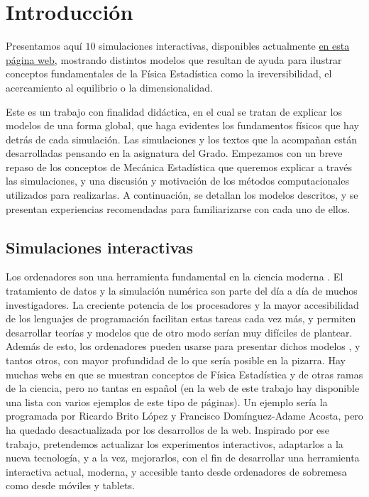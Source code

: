 \documentclass[11pt, a4paper]{article} %
\theoremstyle{named}
\begin{document}

\newpage
{}

\tableofcontents

\newpage
\section{Introducción}
\label{sec:intro}

Presentamos aquí $10$ simulaciones interactivas, disponibles actualmente \href{http://funcionando.works/TFG/index.html}{en esta página web}, mostrando distintos modelos que resultan de ayuda para ilustrar conceptos fundamentales de la Física Estadística como la ireversibilidad, el acercamiento al equilibrio o la dimensionalidad.

Este es un trabajo con finalidad didáctica, en el cual se tratan de explicar los modelos de una forma global, que haga evidentes los fundamentos físicos que hay detrás de cada simulación. Las simulaciones y los textos que la acompañan están desarrolladas pensando en la asignatura del Grado.
Empezamos con un breve repaso de los conceptos de Mecánica Estadística que queremos explicar a través las simulaciones, y una discusión y motivación de los métodos computacionales utilizados para realizarlas. A continuación, se detallan los modelos descritos, y se presentan experiencias recomendadas para familiarizarse con cada uno de ellos.

\subsection{Simulaciones interactivas}\label{sec:sims}

Los ordenadores son una herramienta fundamental en la ciencia moderna \cite{allen}. El tratamiento de datos y la simulación numérica son parte del día a día de muchos investigadores. La creciente potencia de los procesadores y la mayor accesibilidad de los lenguajes de programación facilitan estas tareas cada vez más, y permiten desarrollar teorías y modelos que de otro modo serían muy difíciles de plantear.
Además de esto, los ordenadores pueden usarse para presentar dichos modelos \cite{krauth}, y tantos otros, con mayor profundidad de lo que sería posible en la pizarra. Hay muchas webs en que se muestran conceptos de Física Estadística y de otras ramas de la ciencia, pero no tantas en español (en la web de este trabajo hay disponible una lista con varios ejemplos de este tipo de páginas).
Un ejemplo sería la programada por Ricardo Brito López y Francisco Domínguez-Adame Acosta, pero ha quedado desactualizada por los desarrollos de la web. Inspirado por ese trabajo, pretendemos actualizar los experimentos interactivos, adaptarlos a la nueva tecnología, y a la vez, mejorarlos, con el fin de desarrollar una herramienta interactiva actual, moderna, y accesible tanto desde ordenadores de sobremesa como desde móviles y tablets.
\end{document}
